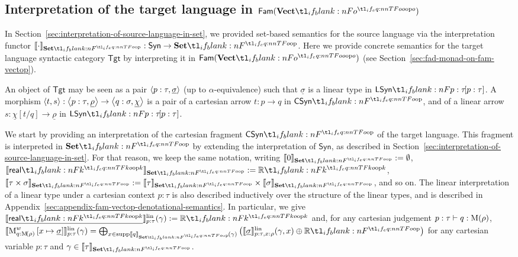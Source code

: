 \documentclass[11pt,a4paper]{article}
\theoremstyle{definition}
\theoremstyle{remark}
\providecommand{\Syn}{\mathsf{Syn}}
\providecommand{\Fam}[1]{\mathsf{Fam}(#1)}
\providecommand{\casubst}[3]{#1[#3/#2]}
\providecommand{\supp}{\operatorname{supp}}
\providecommand{\lintype}[1]{\underline{#1}}
\providecommand{\setint}[1]{\llbracket #1\rrbracket_{\Set}}
\providecommand{\linint}[2]{\llbracket #1\rrbracket_{#2}^{\mathrm{lin}}}
\providecommand{\Tgt}{\mathsf{Tgt}}
\begin{document}
\subsection{Interpretation of the target language  in \texorpdfstring{\( \Fam{\Vect[o]} \)}{Fam(VectOp)}}
\label{sec:interpretation-of-the-target-language-in-fam-vectop}

In Section~\ref{sec:interpretation-of-source-language-in-set}, we provided set-based semantics for the source language via the interpretation functor \( \setint{\cdot} : \Syn \to \Set \). Here we provide concrete semantics for the target language syntactic category \( \Tgt \) by interpreting it in \( \Fam{\Vect[o]} \) (see Section~\ref{sec:fad-monad-on-fam-vectop}).

An object of \( \Tgt \) may be seen as a pair \( \tuple{ p : \tau, \lintype{\sigma} } \) (up to \( \alpha \)-equivalence) such that \( \lintype{\sigma} \) is a linear type in \( \LSyn[p : \tau] \). A morphism \( \tuple{ t, s }: \tuple{ p : \tau, \lintype{\rho} } \to \tuple{ q : \sigma, \lintype{\chi} } \) is a pair of a cartesian arrow \( t: p \to q \) in \( \CSyn \), and of a linear arrow \( s: \casubst{\lintype{\chi}}{q}{t} \to \lintype{\rho} \) in \( \LSyn[p : \tau] \).

We start by providing an interpretation of the cartesian fragment \( \CSyn \) of the target language. This fragment is interpreted in \( \Set \) by extending the interpretation of \( \Syn \), as described in Section~\ref{sec:interpretation-of-source-language-in-set}. For that reason, we keep the same notation, writing \( \setint{0} := \emptyset \), \( \setint{\srcreal[k]} := \R[k] \), \( \setint{\tau \times \sigma} := \setint{\tau} \times \setint{\sigma} \), and so on.
The linear interpretation of a linear type under a cartesian context \( p : \tau \) is also described inductively over the structure of the linear types, and is described in Appendix~\ref{sec:appendix-fam-vectop-denotational-semantics}. In particular, we give
\(
\fn[n]{
  \linint{
    \lintype{\srcreal[k]}
  }{p : \tau}
}{ \gamma } := \R[k]
\)
and, for any cartesian judgement
\(
p: \tau \vdash q:\Fun[nn]{\opn[b]{M}}{\rho}
\),
\(
\fn[n]{
  \linint{
    \opn[b]{M}^{w}_{q : \Fun[nn]{ \opn[b]{M} }{ \rho }}
    \left[ x \mapsto \lintype{\sigma} \right]
  }{p : \tau}
}{\gamma}
=
\bigoplus_{x \in \supp \fn[n]{ \setint{q} }{\gamma} }
\left(
  \fn[n]{ \linint{\lintype{\sigma}}{p : \tau, x : \rho} }{ \gamma, x }
  \oplus \R
\right)
\)
for any cartesian variable \( p : \tau \) and \( \gamma \in \setint{\tau} \).
\end{document}
